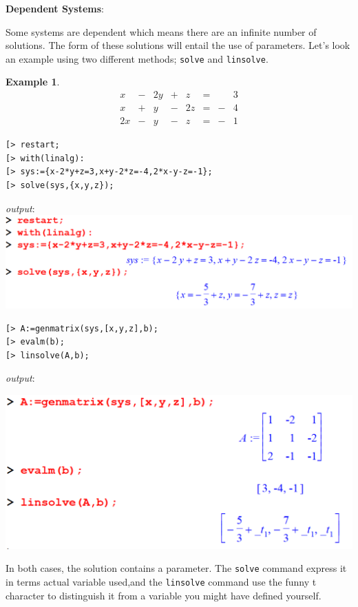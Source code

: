 \documentclass[
]{book}
\theoremstyle{definition}
\theoremstyle{definition}
\newtheorem{example}{Example}[chapter]
\theoremstyle{definition}
\theoremstyle{definition}
\theoremstyle{remark}
\begin{document}
\textbf{Dependent Systems}:

Some systems are dependent which means there are an infinite number of solutions. The form of these solutions will entail the use of parameters.
Let's look an example using two different methods; \texttt{solve} and \texttt{linsolve}.

\begin{example}
\protect\hypertarget{exm:unnamed-chunk-24}{}\label{exm:unnamed-chunk-24}\[
\begin{array}{ccccccccc}
x &-& 2y&+& z &=& &3\\
x &+& y &-& 2z&=&-&4\\
2x&-& y &-& z &=&-&1  
\end{array}
\]
\end{example}

\begin{verbatim}
[> restart;
[> with(linalg):
[> sys:={x-2*y+z=3,x+y-2*z=-4,2*x-y-z=-1};
[> solve(sys,{x,y,z});
\end{verbatim}

\emph{output}:
\includegraphics{figures/Lesson 5/fig9.png}

\begin{verbatim}
[> A:=genmatrix(sys,[x,y,z],b);
[> evalm(b);
[> linsolve(A,b);
\end{verbatim}

\emph{output}:

\includegraphics{figures/Lesson 5/fig10.png}

In both cases, the solution contains a parameter.
The \texttt{solve} command express it in terms actual variable used,and the \texttt{linsolve} command use the funny t character to distinguish it from a variable you might have defined yourself.
\end{document}
